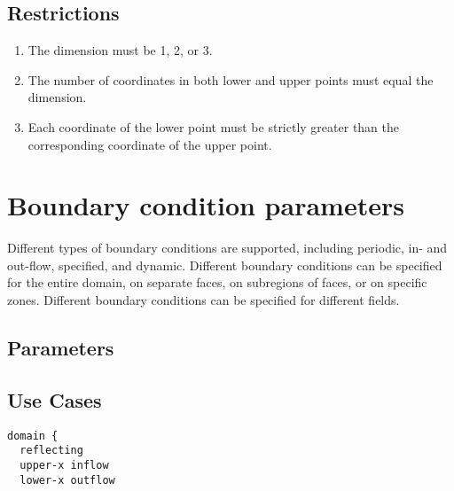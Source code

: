 \documentclass{book}
\begin{document}
\subsection{Restrictions}

\begin{enumerate}
\item The dimension must be 1, 2, or 3.
\item The number of coordinates in both lower and upper points must equal the dimension.
\item Each coordinate of the lower point must be strictly greater than the corresponding coordinate of the upper point.
\end{enumerate}

\section{Boundary condition parameters} \label{s:boundary}

Different types of boundary conditions are supported, including
periodic, in- and out-flow, specified, and dynamic.  Different
boundary conditions can be specified for the entire domain,
on separate faces, on subregions of faces, or on specific zones.
Different boundary conditions can be specified for different fields.
\subsection{Parameters}
\subsection{Use Cases}

\begin{verbatim}
domain {
  reflecting
  upper-x inflow
  lower-x outflow
\end{verbatim}

\end{document}
